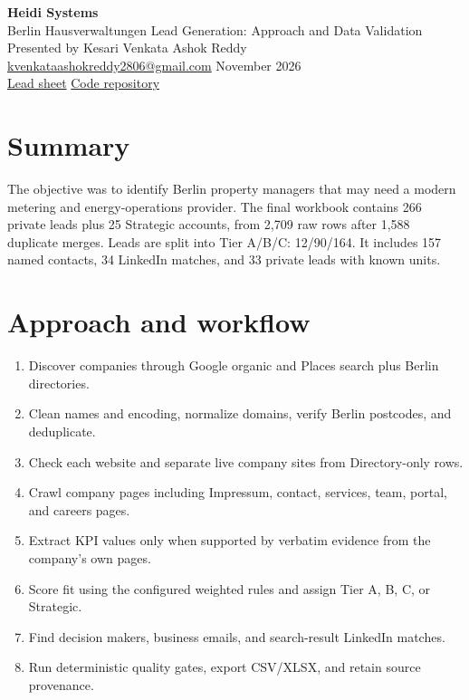 \documentclass[10pt,a4paper]{article}
\begin{document}
\begin{center}
{\LARGE\bfseries Heidi Systems}\\[-1pt]
{\large Berlin Hausverwaltungen Lead Generation: Approach and Data Validation}\\
Presented by Kesari Venkata Ashok Reddy\\
\href{mailto:kvenkataashokreddy2806@gmail.com}{kvenkataashokreddy2806@gmail.com}
 November 2026\\
\href{https://docs.google.com/spreadsheets/d/17fmN5F_6Fj-DWNf3XDGJreVLjX2GBru-b7V5Q3dp2e0/edit?usp=sharing}{Lead sheet} \quad
\href{https://github.com/Ashokreddy2806/Property\_Management\_Berlin}{Code repository}
\end{center}

\section{Summary}
The objective was to identify Berlin property managers that may need a modern metering and energy-operations provider. The final workbook contains 266 private leads plus 25 Strategic accounts, from 2,709 raw rows after 1,588 duplicate merges. Leads are split into Tier A/B/C: 12/90/164. It includes 157 named contacts, 34 LinkedIn matches, and 33 private leads with known units.

\section{Approach and workflow}
\begin{enumerate}
\item Discover companies through Google organic and Places search plus Berlin directories.
\item Clean names and encoding, normalize domains, verify Berlin postcodes, and deduplicate.
\item Check each website and separate live company sites from Directory-only rows.
\item Crawl company pages including Impressum, contact, services, team, portal, and careers pages.
\item Extract KPI values only when supported by verbatim evidence from the company's own pages.
\item Score fit using the configured weighted rules and assign Tier A, B, C, or Strategic.
\item Find decision makers, business emails, and search-result LinkedIn matches.
\item Run deterministic quality gates, export CSV/XLSX, and retain source provenance.
\end{enumerate}
\end{document}
